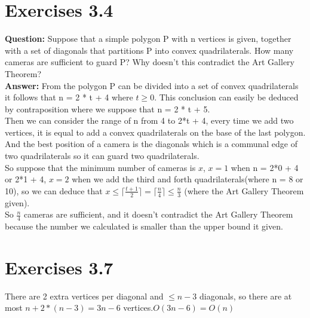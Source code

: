 \documentclass[12pt]{article}
\begin{document}
\section{Exercises 3.4}
\textbf{Question:}
Suppose that a simple polygon P with n vertices is given, together with a set of diagonals that partitions P into convex quadrilaterals. How many cameras are sufficient to guard P? Why doesn’t this contradict the Art Gallery Theorem?\\
\textbf{Answer:} 
From the polygon P can be divided into a set of convex quadrilaterals it follows that n = 2 * t + 4 where $t \geq 0$. This conclusion can easily be deduced by contraposition where we suppose that n =  2 * t + 5.\\
Then we can consider the range of n from 4 to 2*t + 4, every time we add two vertices, it is equal to add a convex quadrilaterals on the base of the last polygon.\\
And the best position of a camera is the diagonals which is a communal edge of two quadrilaterals so it can guard two quadrilaterals.\\
So suppose that the minimum number of cameras is $x$, $x = 1$ when n = 2*0 + 4 or 2*1 + 4, $x = 2$ when we add the third and forth quadrilaterals(where n = 8 or 10), so we can deduce that $x \leq \lceil \frac{t + 1}{2}\rceil = \lceil \frac{n}{4}\rceil \leq \frac{n}{3} $ (where the Art Gallery Theorem given).\\
So $\frac{n}{4}$ cameras are sufficient, and it doesn't contradict the Art Gallery Theorem because the number we calculated is smaller than the upper bound it given.


\section{Exercises 3.7}
There are 2 extra vertices  per diagonal and $\leq n-3$ diagonals, so there are at most  $n+2*(n-3)=3n-6$ vertices.$O(3n-6) = O(n)$
\end{document}
